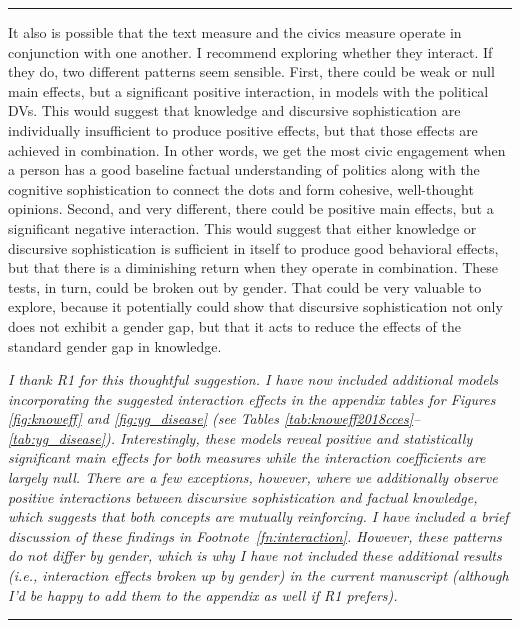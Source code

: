 
\rule{\linewidth}{.01cm}

It also is possible that the text measure and the civics measure operate in conjunction with one another. I recommend exploring whether they interact. If they do, two different patterns seem sensible. First, there could be weak or null main effects, but a significant positive interaction, in models with the political DVs. This would suggest that knowledge and discursive sophistication are individually insufficient to produce positive effects, but that those effects are achieved in combination. In other words, we get the most civic engagement when a person has a good baseline factual understanding of politics along with the cognitive sophistication to connect the dots and form cohesive, well-thought opinions. Second, and very different, there could be positive main effects, but a significant negative interaction. This would suggest that either knowledge or discursive sophistication is sufficient in itself to produce good behavioral effects, but that there is a diminishing
return when they operate in combination. These tests, in turn, could be broken out by gender. That could be very valuable to explore, because it potentially could show that discursive sophistication not only does not exhibit a gender gap, but that it acts to reduce the effects of the standard gender gap in knowledge.

\textit{I thank R1 for this thoughtful suggestion. I have now included additional models incorporating the suggested interaction effects in the appendix tables for Figures \ref{fig:knoweff} and \ref{fig:yg_disease} (see Tables \ref{tab:knoweff2018cces}--\ref{tab:yg_disease}). Interestingly, these models reveal positive and statistically significant main effects for both measures while the interaction coefficients are largely null. There are a few exceptions, however, where we additionally observe {\normalfont positive} interactions between discursive sophistication and factual knowledge, which suggests that both concepts are mutually reinforcing. I have included a brief discussion of these findings in Footnote~\ref{fn:interaction}. However, these patterns do not differ by gender, which is why I have not included these additional results (i.e., interaction effects broken up by gender) in the current manuscript (although I'd be happy to add them to the appendix as well if R1 prefers).}


\rule{\linewidth}{.01cm}

